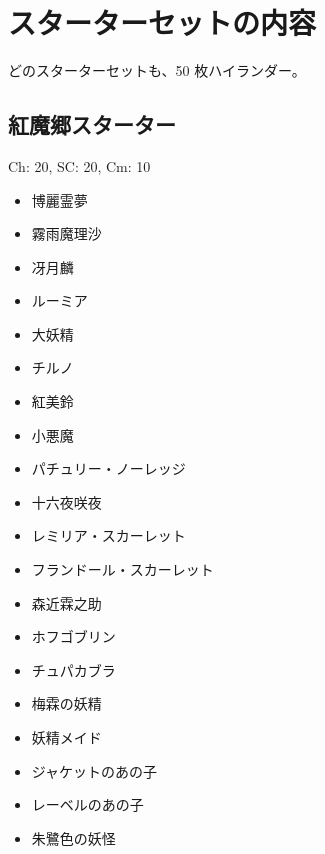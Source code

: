 \documentclass[line_length=22zw,number_of_lines=45,twocolumn]{jlreq}
\begin{document}
\section{スターターセットの内容}
どのスターターセットも、50 枚ハイランダー。
\clearpage\small
\subsection{紅魔郷スターター}
Ch: 20, SC: 20, Cm: 10
\begin{itemize}
	\item 博麗霊夢
	\item 霧雨魔理沙
	\item 冴月麟
	\item ルーミア
	\item 大妖精
	\item チルノ
	\item 紅美鈴
	\item 小悪魔
	\item パチュリー・ノーレッジ
	\item 十六夜咲夜
	\item レミリア・スカーレット
	\item フランドール・スカーレット
	\item 森近霖之助
	\item ホフゴブリン
	\item チュパカブラ
	\item 梅霖の妖精
	\item 妖精メイド
	\item ジャケットのあの子
	\item レーベルのあの子
	\item 朱鷺色の妖怪
\end{itemize}
\pagebreak
\end{document}
